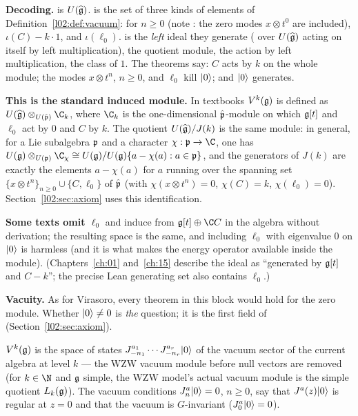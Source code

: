 \begin{dictionary}
\textbf{Decoding.}  is $U(\widehat{\mathfrak{g}})$.  is the set of three
kinds of elements of Definition~\ref{l02:def:vacuum}:  for $n\ge0$ (note
: the zero modes $x\otimes t^0$ are included), $\iota(C) - k\cdot1$, and $\iota(\ell_0)$.
 is the \emph{left} ideal they generate ( over $U(\widehat{\mathfrak{g}})$
acting on itself by left multiplication),  the quotient module, 
the action by left multiplication,  the class of $1$. The theorems say: $C$ acts
by $k$ on the whole module; the modes $x\otimes t^n$, $n\ge0$, and $\ell_0$ kill $|0\rangle$; and
$|0\rangle$ generates.

\textbf{This is the standard induced module.} In textbooks $V^k(\mathfrak{g})$ is defined as
$U(\ltwoghat)\otimes_{U(\hat{\ltwop})}\C_k$, where $\C_k$ is the one-dimensional $\hat{\mathfrak{p}}$-module on
which $\mathfrak{g}[t]$ and $\ell_0$ act by $0$ and $C$ by $k$. The quotient $U(\widehat{\mathfrak{g}})/J(k)$ is the same
module: in general, for a Lie subalgebra $\mathfrak{p}$ and a character $\chi:\ltwop\to\C$, one has
$U(\ltwog)\otimes_{U(\ltwop)}\C_\chi\cong U(\ltwog)/U(\ltwog)\{a-\chi(a): a\in\ltwop\}$, and the
generators of $J(k)$ are exactly the elements $a-\chi(a)$ for $a$ running over the spanning set
$\{x\otimes t^n\}_{n\ge0}\cup\{C,\ell_0\}$ of $\hat{\mathfrak{p}}$ (with $\chi(x\otimes t^n) = 0$,
$\chi(C) = k$, $\chi(\ell_0) = 0$). Section~\ref{l02:sec:axiom} uses this identification.

\textbf{Some texts omit $\ell_0$} and induce from $\ltwog[t]\oplus\C C$ in the algebra without
derivation; the resulting space is the same, and including $\ell_0$ with eigenvalue $0$ on $|0\rangle$
is harmless (and it is what makes the energy operator available inside the module).
(Chapters~\ref{ch:01} and~\ref{ch:15} describe the ideal as ``generated by $\mathfrak{g}[t]$ and $C-k$'';
the precise Lean generating set also contains $\ell_0$.)

\textbf{Vacuity.} As for Virasoro, every theorem in this block would hold for the zero module.
Whether $|0\rangle\ne0$ is \emph{the} question; it is the first field of 
(Section~\ref{l02:sec:axiom}).
\end{dictionary}

\begin{physics}
$V^k(\mathfrak{g})$ is the space of states $J^{a_1}_{-n_1}\cdots J^{a_r}_{-n_r}|0\rangle$ of the vacuum
sector of the current algebra at level $k$ --- the WZW vacuum module before null vectors are removed
(for $k\in\N$ and $\mathfrak{g}$ simple, the WZW model's actual vacuum module is the simple quotient
$L_k(\mathfrak{g})$). The vacuum conditions $J^a_n|0\rangle = 0$, $n\ge0$, say that $J^a(z)|0\rangle$ is regular
at $z=0$ and that the vacuum is $G$-invariant ($J^a_0|0\rangle = 0$).
\end{physics}

